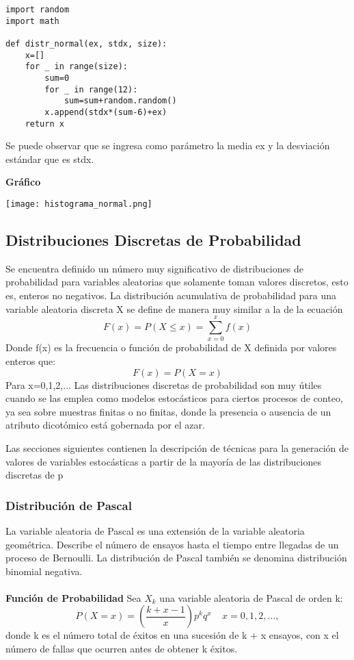 \documentclass[11pt]{article}
\begin{document}
\begin{lstlisting}
import random
import math

def distr_normal(ex, stdx, size):
    x=[]
    for _ in range(size):
        sum=0
        for _ in range(12):
            sum=sum+random.random()
        x.append(stdx*(sum-6)+ex)
    return x
\end{lstlisting}
Se puede observar que se ingresa como parámetro la media ex y la desviación estándar que es stdx.

\noindent\textbf{Gráfico}\\

\begin{center}
\texttt{[image: histograma\_normal.png]}
\end{center}


\subsection{Distribuciones Discretas de Probabilidad}
Se encuentra definido un número muy significativo de distribuciones de probabilidad para variables aleatorias que solamente toman valores discretos, esto es, enteros no negativos. La distribución acumulativa de probabilidad para una variable aleatoria discreta X se define de manera muy similar a la de la ecuación
\begin{equation}
F(x) = P(X \leq x) = \sum_{x=0}^{x}f(x)
\end{equation}
Donde f(x) es la frecuencia o función de probabilidad de X definida por valores enteros que:
\begin{equation}
F(x) = P(X= x)
\end{equation}
Para x=0,1,2,...
Las distribuciones discretas de probabilidad son muy útiles cuando se las emplea como modelos estocásticos para ciertos procesos de conteo, ya sea sobre muestras finitas o no finitas, donde la presencia o ausencia de un atributo dicotómico está gobernada por el azar.

Las secciones siguientes contienen la descripción de técnicas para la generación de valores de variables estocásticas a partir de la mayoría de las distribuciones discretas de p

\subsubsection{Distribución de Pascal}
La variable aleatoria de Pascal es una extensión de la variable aleatoria geométrica. Describe el número de ensayos hasta el tiempo entre llegadas de un proceso de Bernoulli. La distribución de Pascal también se denomina distribución binomial negativa.
\\ \\
\noindent\textbf{Función de Probabilidad\newline}
Sea $X_k$ una variable aleatoria de Pascal de orden k:
 \begin{equation}
    P(X = x) = (\frac{k+x-1}{x})p^{k}q^{x} \ \text{   } \ x = 0,1,2,...,
  \end{equation}
  donde k es el número total de éxitos en una sucesión de k + x ensayos, con x el número de fallas que ocurren antes de obtener k éxitos.
\end{document}
